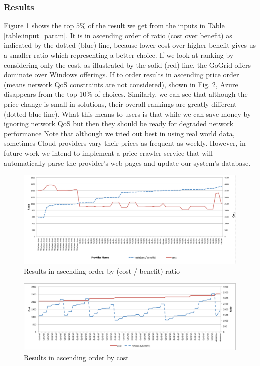 \subsubsection{Results}
Figure \ref{fig7} shows the top $5\%$ of the result we get from the inputs in Table \ref{table:input_param}. It is in ascending order of ratio (cost over benefit) as indicated by the dotted (blue) line, because lower cost over higher benefit gives us a smaller ratio which representing a better choice.  If we look at ranking by considering only the cost, as illustrated by the solid (red) line, the GoGrid offers dominate over Windows offerings. If to order results in ascending price order (means network QoS constraints are not considered), shown in Fig. \ref{fig8}, Azure disappears from the top $10\%$ of choices. Similarly, we can see that although the price change is small in solutions, their overall rankings are greatly different (dotted blue line). What this means to users is that while we can save money by ignoring network QoS but then they should be ready for degraded network performance Note that although we tried out best in using real world data, sometimes Cloud providers vary their prices as frequent as weekly. However, in future work we intend to implement a price crawler service that will automatically parse the provider's web pages and update our system's database.

\begin{figure}[ht]
    \centering
    \includegraphics[angle=-90, scale=0.6]{Figures/AHP/figure7.pdf}
    \caption{Results in ascending order by (cost / benefit) ratio}
    \label{fig7}
\end{figure}

\begin{figure}[ht]
 \centering
 \includegraphics[angle=-90, scale=0.7]{Figures/AHP/figure8.pdf}
 \caption{Results in ascending order by cost}
\label{fig8}
\end{figure}

